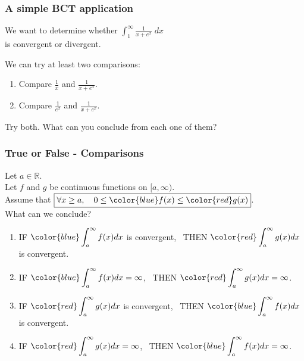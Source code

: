 \begin{frame}[t]
	\fontsize{13}{13}\selectfont
	\frametitle{A simple BCT application}

	We want to determine whether $\displaystyle \int_{1}^{\infty}\frac{1}{x+e^{x}}\;
	dx$ \\ is convergent or divergent.

	We can try at least two comparisons:

	\begin{enumerate}
		\item Compare $\displaystyle \frac{1}{x}$ and $\displaystyle \frac{1}{x+ e^{x}}$.

		\item Compare $\displaystyle \frac{1}{e^{x}}$ and $\displaystyle \frac{1}{x+
			e^{x}}$.
	\end{enumerate}

	Try both. What can you conclude from each one of them?
\end{frame}

\begin{frame}[t]
	\fontsize{11}{11}\selectfont
	\frametitle{True or False - Comparisons}

	Let $a \in \mathbb{R}$. \\ Let $f$ and $g$ be continuous functions on
	$[a, \infty)$. \\ Assume that $\displaystyle \boxed{\forall x \geq a, \quad 0 \leq {\color{blue} f(x)} \leq {\color{red} g(x)}}$.
	\\ What can we conclude?

	\begin{enumerate}
		\item IF $\displaystyle{\color{blue} \int_a^{\infty} f(x) dx}$ is convergent,
			\, THEN $\displaystyle{\color{red} \int_a^{\infty} g(x) dx}$ is convergent.

		\item IF $\displaystyle{\color{blue} \int_a^{\infty} f(x) dx}= \infty$, \,
			THEN $\displaystyle{\color{red} \int_a^{\infty} g(x) dx}= \infty$.

		\item IF $\displaystyle{\color{red} \int_a^{\infty} g(x) dx}$ is convergent,
			\, THEN $\displaystyle{\color{blue} \int_a^{\infty} f(x) dx}$ is
			convergent.

		\item IF $\displaystyle{\color{red} \int_a^{\infty} g(x) dx}= \infty$, \,
			THEN $\displaystyle{\color{blue} \int_a^{\infty} f(x) dx}= \infty$.
	\end{enumerate}
\end{frame}

